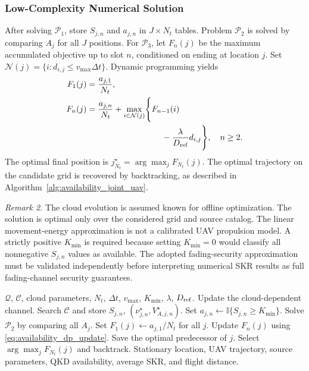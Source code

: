 \documentclass[conference,a4paper]{IEEEtran}
\begin{document}
\subsubsection{Low-Complexity Numerical Solution}
After solving $\mathcal P_1$, store $S_{j,n}$ and $a_{j,n}$
in $J\times N_t$ tables. Problem $\mathcal P_2$ is solved by
comparing $A_j$ for all $J$ positions. For $\mathcal P_3$,
let $F_n(j)$ be the maximum accumulated objective up to
slot $n$, conditioned on ending at location $j$. Set
$\mathcal N(j)=\{i:d_{i,j}\leq v_{\max}\Delta t\}$. Dynamic
programming yields
\begin{align}
F_1(j)
={}&\frac{a_{j,1}}{N_t},
\label{eq:availability_dp_init}
\\
F_n(j)
={}&\frac{a_{j,n}}{N_t}
+\max_{i\in\mathcal N(j)}\!\Bigg\{
F_{n-1}(i)
\nonumber\\
&\hspace{27mm}-\frac{\lambda}{D_{\rm ref}}d_{i,j}
\Bigg\},\quad n\geq2.
\label{eq:availability_dp_update}
\end{align}
The optimal final position is
$j_{N_t}^{\star}=\arg\max_jF_{N_t}(j)$. The optimal
trajectory on the candidate grid is recovered by
backtracking, as described in
Algorithm~\ref{alg:availability_joint_uav}.

\noindent\textit{Remark 2.}
The cloud evolution is assumed known for offline optimization.
The solution is optimal only over the considered grid and
source catalog. The linear movement-energy approximation
is not a calibrated UAV propulsion model. A strictly
positive $K_{\min}$ is required because setting $K_{\min}=0$
would classify all nonnegative $S_{j,n}$ values as available.
The adopted fading-security approximation must be validated
independently before interpreting numerical SKR results as
full fading-channel security guarantees.

\begin{algorithm}[t]
\caption{Availability-Aware Joint Source and UAV Position Optimization}
\label{alg:availability_joint_uav}
\begin{algorithmic}[1]
\Require $\mathcal Q$, $\mathcal C$, cloud parameters,
$N_t$, $\Delta t$, $v_{\max}$, $K_{\min}$,
$\lambda$, $D_{\rm ref}$.
    \State Update the cloud-dependent channel.
    \State Search $\mathcal C$ and store $S_{j,n}$,
    $(\nu_{j,n}^{\star},V_{A,j,n}^{\star})$.
    \State Set $a_{j,n}\gets\mathbb I\{S_{j,n}\geq K_{\min}\}$.
  \EndFor
\EndFor
\State Solve $\mathcal P_2$ by comparing all $A_j$.
\State Set $F_1(j)\gets a_{j,1}/N_t$ for all $j$.
    \State Update $F_n(j)$ using
    \eqref{eq:availability_dp_update}.
    \State Save the optimal predecessor of $j$.
  \EndFor
\EndFor
\State Select $\arg\max_jF_{N_t}(j)$ and backtrack.
\Ensure Stationary location, UAV trajectory,
source parameters, QKD availability, average SKR,
and flight distance.
\end{algorithmic}
\end{algorithm}
\end{document}
